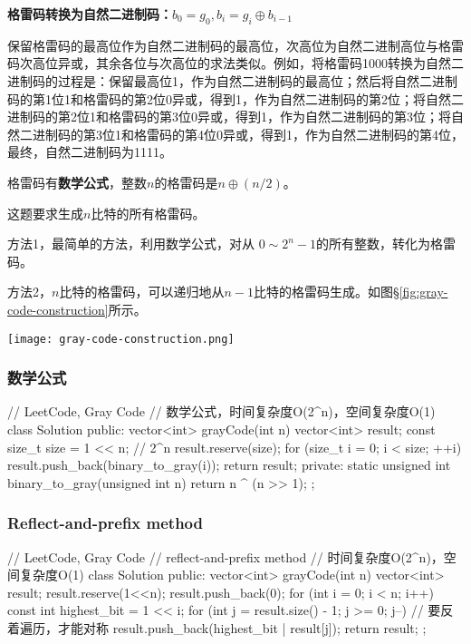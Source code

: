 \textbf{格雷码转换为自然二进制码：$b_0=g_0, b_i=g_i \oplus b_{i-1}$}

保留格雷码的最高位作为自然二进制码的最高位，次高位为自然二进制高位与格雷码次高位异或，其余各位与次高位的求法类似。例如，将格雷码1000转换为自然二进制码的过程是：保留最高位1，作为自然二进制码的最高位；然后将自然二进制码的第1位1和格雷码的第2位0异或，得到1，作为自然二进制码的第2位；将自然二进制码的第2位1和格雷码的第3位0异或，得到1，作为自然二进制码的第3位；将自然二进制码的第3位1和格雷码的第4位0异或，得到1，作为自然二进制码的第4位，最终，自然二进制码为1111。

格雷码有\textbf{数学公式}，整数$n$的格雷码是$n \oplus (n/2)$。

这题要求生成$n$比特的所有格雷码。

方法1，最简单的方法，利用数学公式，对从 $0\sim2^n-1$的所有整数，转化为格雷码。

方法2，$n$比特的格雷码，可以递归地从$n-1$比特的格雷码生成。如图\S \ref{fig:gray-code-construction}所示。

\begin{center}
\texttt{[image: gray-code-construction.png]}\\
\label{fig:gray-code-construction}
\end{center}


\subsubsection{数学公式}
\begin{Code}
// LeetCode, Gray Code
// 数学公式，时间复杂度O(2^n)，空间复杂度O(1)
class Solution {
public:
    vector<int> grayCode(int n) {
        vector<int> result;
        const size_t size = 1 << n;  // 2^n
        result.reserve(size);
        for (size_t i = 0; i < size; ++i)
            result.push_back(binary_to_gray(i));
        return result;
    }
private:
    static unsigned int binary_to_gray(unsigned int n) {
        return n ^ (n >> 1);
    }
};
\end{Code}


\subsubsection{Reflect-and-prefix method}
\begin{Code}
// LeetCode, Gray Code
// reflect-and-prefix method
// 时间复杂度O(2^n)，空间复杂度O(1)
class Solution {
public:
    vector<int> grayCode(int n) {
        vector<int> result;
        result.reserve(1<<n);
        result.push_back(0);
        for (int i = 0; i < n; i++) {
            const int highest_bit = 1 << i;
            for (int j = result.size() - 1; j >= 0; j--) // 要反着遍历，才能对称
                result.push_back(highest_bit | result[j]);
        }
        return result;
    }
};
\end{Code}


